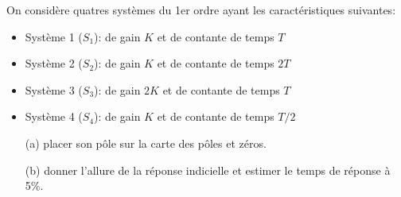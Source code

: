 \clearpage
On considère quatres systèmes du 1er ordre ayant les caractéristiques suivantes:
\begin{itemize}
    \item Système 1 ($S_1$): de gain $K$ et de contante de temps $T$
    \item Système 2 ($S_2$): de gain $K$ et de contante de temps $2T$
    \item Système 3 ($S_3$): de gain $2K$ et de contante de temps $T$
    \item Système 4 ($S_4$): de gain $K$ et de contante de temps $T/2$
\end{itemize}
\begin{itemize}
    \item[(a)] placer son pôle sur la carte des pôles et zéros.
    \item[(b)] donner l'allure de la réponse indicielle et estimer le temps
               de réponse à 5\%.
\end{itemize}

